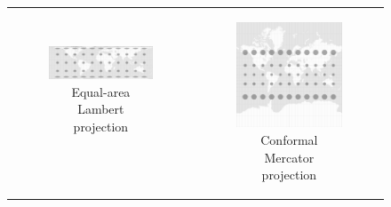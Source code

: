 \begin{figure}[H]
  \centering
  \begin{tabular}{c c}
    \begin{subfigure}{0.5\textwidth}
      \centering
      \includegraphics[width=0.95\linewidth]{graphics/basics/hgis/projection_distortion_lambert.png}
      \caption{Equal-area Lambert projection}
    \end{subfigure}
    &
    \multirow{2}{*}{
      \begin{subfigure}{0.4\textwidth}
        \vspace{-3.3em}
        \centering
        \includegraphics[width=0.95\linewidth]{graphics/basics/hgis/projection_distortion_mercator.png}
        \caption{Conformal Mercator projection}
        \label{fig:mercator}
      \end{subfigure}
    } \\
    \begin{subfigure}{0.5\textwidth}
      \vspace{1em}

\end{subfigure}
\end{tabular}
\end{figure}
